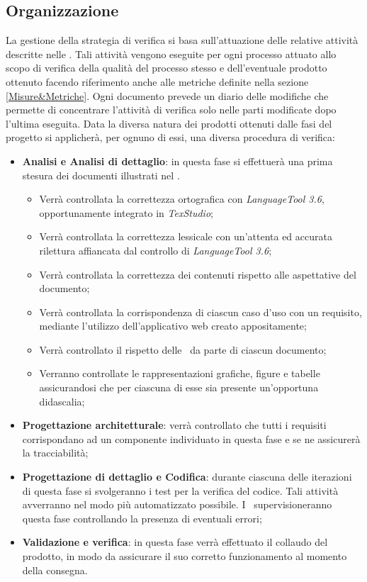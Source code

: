 \documentclass[../PianoDiQualifica.tex]{subfiles}
\begin{document}
		\subsection{Organizzazione}
			La gestione della strategia di verifica si basa sull'attuazione delle
			relative attività descritte nelle \normediprogettov. Tali attività vengono
			eseguite per ogni processo attuato allo scopo di verifica della qualità del
			processo stesso e dell'eventuale prodotto ottenuto facendo riferimento
			anche alle metriche definite nella sezione \ref{Misure&Metriche}.
			Ogni documento prevede un diario delle modifiche che permette di concentrare
			l'attività di verifica solo nelle parti modificate dopo l'ultima eseguita.
			Data la diversa natura dei prodotti ottenuti dalle fasi del progetto si
			applicherà, per ognuno di essi, una diversa procedura di verifica:
			\begin{itemize}
				\item \textbf{Analisi e Analisi di dettaglio}: in questa fase si effettuerà
				una prima stesura dei documenti illustrati nel \pianodiprogettov.
				\begin{itemize}
					\item Verrà controllata la correttezza ortografica con \textit{LanguageTool 3.6},
					opportunamente integrato in \textit{TexStudio};
					\item Verrà controllata la correttezza lessicale con un'attenta ed accurata
					rilettura affiancata dal controllo di \textit{LanguageTool 3.6};
					\item Verrà controllata la correttezza dei contenuti rispetto alle aspettative
					del documento;
					\item Verrà controllata la corrispondenza di ciascun caso d'uso con un requisito,
					mediante l'utilizzo dell'applicativo web creato appositamente;
					\item Verrà controllato il rispetto delle \normediprogettov\ da parte di ciascun
					documento;
					\item Verranno controllate le rappresentazioni grafiche, figure e tabelle
					assicurandosi che per ciascuna di esse sia presente un'opportuna didascalia;
				\end{itemize}
				\item \textbf{Progettazione architetturale}: verrà controllato che tutti i requisiti
				corrispondano ad un componente individuato in questa fase e se ne assicurerà la
				tracciabilità;
				\item \textbf{Progettazione di dettaglio e Codifica}: durante ciascuna delle
				iterazioni di questa fase si svolgeranno i test per la verifica del codice. Tali
				attività avverranno nel modo più automatizzato possibile. I \verificatori\
				supervisioneranno questa fase controllando la presenza di eventuali errori;
				\item \textbf{Validazione e verifica}: in questa fase verrà effettuato il collaudo
				del prodotto, in modo da assicurare il suo corretto funzionamento al momento
				della consegna.
			\end{itemize} 
\end{document}
